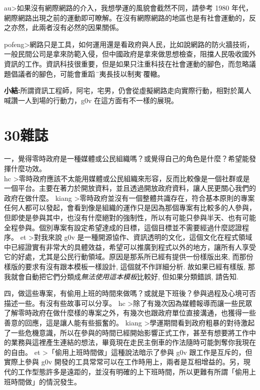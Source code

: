 au\textgreater 如果沒有網際網路的介入，我想學運的風貌會截然不同，請參考 1980 年代，網際網路出現之前的運動即可瞭解。在沒有網際網路的地區也是有社會運動的，反之亦然，此兩者沒有必然的因果關係。

pofeng\textgreater 網路只是工具，如何運用還是看政府與人民，比如說網路的防火牆技術，一般民間公司是拿來防範入侵，但中國政府是拿來做思想檢查，阻擋人民吸收國外資訊的工作。資訊科技很重要，但是如果只注重科技在社會運動的腳色，而忽略議題倡議者的腳色，可能會重蹈 \"師夷長技以制夷\" 的覆轍。
  
\textbf{小結:}所謂資訊工程師，阿宅，宅男，仍會從虛擬網路走向實際行動，相對於萬人喊讚一人到場的行動力，g0v
在這方面有不一樣的展現。
\section{30雜誌}

  一，覺得零時政府是一種媒體或公民組織嗎？或覺得自己的角色是什麼？希望能發揮什麼功效。  
  \\
hc \textgreater 零時政府應該不太能用媒體或公民組織來形容，反而比較像是一個社群或是一個平台。主要在著力於開放資料，並且透過開放政府資料，讓人民更關心我們的政府在做什麼。
kiang \textgreater 零時政府並沒有一個整體共識存在，符合基本原則的專案任何人都可以發起，會看到像是組織的運作只是因為那個專案有比較多的人參與，但即使是參與其中，也沒有什麼絕對的強制性，所以有可能只參與半天、也有可能全程參與。個別專案有設定希望達成的目標，這個目標並不需要經過什麼認證程序。
et \textgreater 對我來說 g0v 是一種開源協作、資訊透明的文化，這個文化在程式領域中已經證實有非常大的具體效益，希望可以推廣到程式以外的地方，讓所有人享受它的好處，尤其是公民行動領域。原因是那系所已經有提供一份樣版出來, 而那份樣版的要求有沒有跟本模板一樣設計, 這個就不作詳細分析. 故如果已經有樣版, 那我就會自動把它們分類成\textit{無法使用這本模板}比較好, 但如果分類錯誤, 請告知.

 四，做這些專案，有偷用上班的時間來做嗎？或就是下班後？參與過程及心境可否描述一些。有沒有些故事可以分享。
hc \textgreater 除了有幾次因為媒體報導而讓一些民眾了解零時政府在做什麼樣的專案之外，有幾次也跟政府單位直接溝通，也獲得一些善意的回應，這是讓人能有些振奮的。
kiang \textgreater 學運期間看到政府粗暴的對待激起了一些危機意識，所以在參與的時間已經開始影響正式工作，甚至有想要將工作中的業務與這裡產生連結的想法，畢竟現在走民主倒車的作法隨時可能剝奪你我現在的自由。
et \textgreater 「偷用上班時間做」這種說法暗示了參與 g0v 跟工作是互斥的，但實際上參與 g0v 開發的工具常常可以在工作時用上，兩者是互相增益的。另，現代的工作型態許多是遠距的，並沒有明確的上下班時間，所以更難有所謂「偷用上班時間做」的情況發生。


